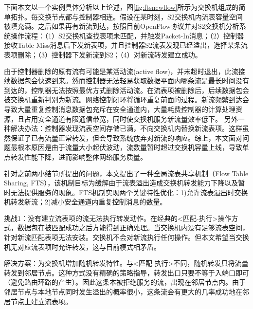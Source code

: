下面本文以一个实例具体分析以上论述，图\ref{fig:ftsnewflow}所示为交换机组成的简单拓扑。每交换节点都与控制器相连。假设在某时刻，S2交换机内流表容量空间被填充满。之后如果再有新流到达，按照目前OpenFlow协议并对S2交换机分析系统操作流程：（1）S2交换机查找表项未匹配，并触发Packet-In消息；（2）控制器接收Table-Miss消息后下发新表项，并且控制器S2流表发现已经溢出，选择某条流表项删除；（3）控制器下发新流到S2；（4）对新流转发建立成功。



由于控制器删除的原有流有可能是某活动流(active flow)，并未超时退出，此流接续数据包会快速到来。然而控制器无法轻易获取数据平面内哪条流是最长时间没有到达的，控制器无法按照最优方式删除活动流。在流表项被删除后，后续数据包会被交换机重新判别为新流。网络控制闭环将循环重复前面的过程。新流频繁到达会导致大量重复控制消息数据包充斥在安全通道内，大量耗费控制器的计算处理资源，且占用安全通道有限通信带宽，同时使交换机服务新流量效率低下。
另外一种解决办法：控制器发现流表空间存储已满，不向交换机内替换新流表项。这样虽然保证了已有流量正常转发，但会导致系统放弃对新流的响应。综上，本文面对问题最根本原因是由于流量大小起伏波动，流数量暂时超过交换机容量上线，导致单点转发性能下降，进而影响整体网络服务质量。




\label{chap54}

针对之前两小结节所提出的问题，本文提出了一种全局流表共享机制（Flow Table Sharing, FTS），该机制目标为缓解由于流表溢出造成交换机转发能力下降以及暂时无法提供服务的现象。FTS机制实现两个关键特性优化：1)允许流表溢出时交换机转发新流；2)减小安全通道内重复控制消息的数量。

\label{chap541}


挑战1：没有建立流表项的流无法执行转发动作。在经典的<匹配-执行>操作方式，数据包在被匹配成功之后方能得到正确处理。当交换机内没有足够流表空间，针对新流匹配表项无法安装。交换机不会对新流执行任何操作。但本文希望当交换机无对应流表项时允许转发，这与目前模式相矛盾。

解决方案：为交换机增加随机转发特性。与<匹配-执行>不同，随机转发只将流量转发到邻居节点。这种方式没有精确的策略指导，转发出口只要不等于入端口即可（避免路由环路的产生）。因此这条本被拒绝服务的流，出现在邻居节点内。由于邻居节点与本地节点同时发生溢出的概率很小，这条流会有更大的几率成功地在邻居节点上建立流表项。



\label{chap542}

